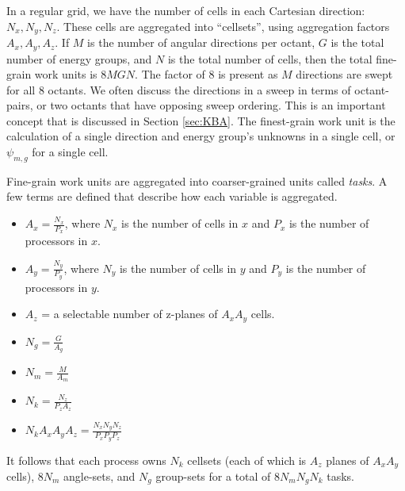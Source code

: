 In a regular grid, we have the  number of cells in each Cartesian direction: $N_x, N_y, N_z$. These cells are aggregated into ``cellsets'', using aggregation factors $A_x, A_y, A_z$. If $M$ is the number of angular directions per octant, $G$ is the total number of energy groups, and $N$ is the total number of cells, then the total fine-grain work units is $8MGN$. The factor of 8 is present as $M$ directions are swept for all 8 octants. We often discuss the directions in a sweep in terms of octant-pairs, or two octants that have opposing sweep ordering. This is an important concept that is discussed in Section \ref{sec:KBA}. The finest-grain work unit is the calculation of a single direction and energy group's unknowns in a single cell, or $\psi_{m,g}$ for a single cell.

Fine-grain work units are aggregated into coarser-grained units called \textit{tasks}. A few terms are defined that describe how each variable is aggregated.
\begin{itemize}
\item $A_x = \frac{N_x}{P_x}$, where $N_x$ is the number of cells in $x$ and $P_x$ is the number of processors in $x$.
\item $A_y = \frac{N_y}{P_y}$, where $N_y$ is the number of cells in $y$ and $P_y$ is the number of processors in $y$.
\item $A_z$ = a selectable number of z-planes of $A_x A_y$ cells.
\item $N_g = \frac{G}{A_g}$
\item $N_m = \frac{M}{A_m}$
\item $N_k = \frac{N_z}{P_z A_z}$
\item $N_k A_x A_y A_z = \frac{N_x N_y N_z}{P_x P_y P_z}$
\end{itemize}

It follows that each process owns $N_k$ cellsets (each of which is $A_z$ planes of $A_x A_y$ cells), $8N_m$ angle-sets, and $N_g$ group-sets for a total of $8N_m N_g N_k$ tasks.

